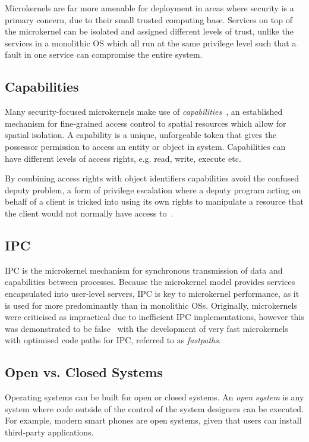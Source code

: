 Microkernels are far more amenable for deployment in areas where security is a primary concern,
due to their small trusted computing base.
Services on top of the microkernel can be isolated and assigned different levels of trust, unlike
the services in a monolithic \gls{OS} which all run at the same privilege level such that a fault in
one service can compromise the entire system. 

\subsection{Capabilities}

Many security-focused microkernels make use of \emph{capabilities}~\citep{Dennis_VanHorn_66}, an
established mechanism for fine-grained access control to spatial resources which allow for spatial
    isolation. A capability is a unique, unforgeable token that gives the possessor permission to access
an entity or object in system. Capabilities can have different levels of access rights, e.g. read,
write, execute etc. 

By combining access rights with object identifiers capabilities avoid the
confused deputy problem, a form of privilege escalation where a deputy program
acting on behalf of a client is  tricked into using
its own rights to manipulate a resource that the client would not normally have access
to~\citep{Hardy_88}. 

\subsection{IPC}
\label{s:background-ipc}

\gls{IPC} is the microkernel mechanism for synchronous transmission of data and capabilities between
processes. Because the microkernel model provides services encapsulated into user-level servers,
\gls{IPC} is key to microkernel performance, as it is used for more predominantly than in monolithic
\glspl{OS}. Originally, microkernels were criticised as impractical due to inefficient IPC
implementations, however this was demonstrated to be false~\citep{Hartig_HLSW_97} with the
development of very fast microkernels with optimised code paths for IPC, referred to as \emph{fastpaths}. 


\subsection{Open vs. Closed Systems}

Operating systems can be built for open or closed systems.  An \emph{open system} is any system
where code outside of the control of the system designers can be executed. For example, modern
smart phones are open systems, given that users can install third-party applications.

